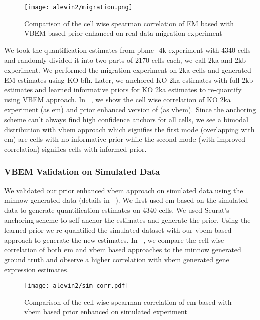   \begin{figure}[!htb]
      \centering
    \texttt{[image: alevin2/migration.png]}
    \caption{ Comparison of the cell wise spearman correlation of EM based \alevin with VBEM based
    prior enhanced \alevin on real data migration experiment}
    \label{fig:alv2_real_val}
  \end{figure}

We took the quantification estimates from pbmc\_4k experiment with 4340 cells and randomly divided it into
two parts of 2170 cells each, we call 2ka and 2kb experiment. We performed the migration experiment on
2ka cells and generated \alevin EM estimates using KO bfh. Later, we anchored KO 2ka estimates 
with full 2kb estimates and learned informative priors for KO 2ka estimates to re-quantify using \alevin VBEM
approach. In ~, we show the cell wise correlation of KO 2ka experiment (as em) and prior
enhanced version of \alevin (as vbem). Since the anchoring scheme can't always find high confidence anchors for 
all cells, we see a bimodal distribution with vbem approach which signifies the first mode (overlapping 
with em) are cells with no informative prior while the second mode (with improved correlation)
signifies cells with informed prior.

\subsubsection{VBEM Validation on Simulated Data}
We validated our prior enhanced vbem approach on simulated data using the minnow generated data (details in
~). We first used em based \alevin on the simulated data to generate quantification
estimates on 4340 cells. We used Seurat's anchoring scheme to self anchor the estimates and generate the
prior. Using the learned prior we re-quantified the simulated dataset with our vbem based approach to generate 
the new estimates. In ~, we compare the cell wise correlation of both em and vbem
based approaches to the minnow generated ground truth and observe a higher correlation with vbem generated
gene expression estimates.

  \begin{figure}[!htb]
      \centering
    \texttt{[image: alevin2/sim\_corr.pdf]}
    \caption{ Comparison of the cell wise spearman correlation of em based \alevin with vbem based
    prior enhanced \alevin on simulated experiment}
    \label{fig:alv2_sim_val}
  \end{figure}

